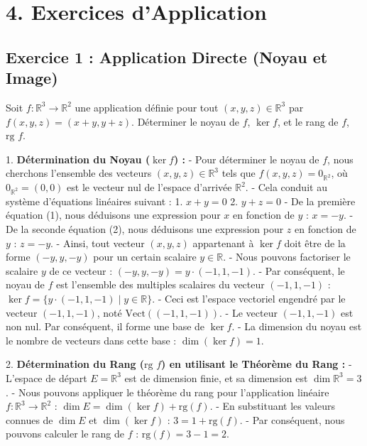 \documentclass{report}
\begin{document}
\section*{4. Exercices d'Application}

\subsection*{Exercice 1 : Application Directe (Noyau et Image)}
 Soit $f : \mathbb{R}^3 \to \mathbb{R}^2$ une application définie pour tout $(x,y,z) \in \mathbb{R}^3$ par $f(x,y,z) = (x+y, y+z)$. Déterminer le noyau de $f$, $\ker f$, et le rang de $f$, $\text{rg } f$.

1.  \textbf{Détermination du Noyau ($\ker f$) :}
    -   Pour déterminer le noyau de $f$, nous cherchons l'ensemble des vecteurs $(x,y,z) \in \mathbb{R}^3$ tels que $f(x,y,z) = 0_{\mathbb{R}^2}$, où $0_{\mathbb{R}^2} = (0,0)$ est le vecteur nul de l'espace d'arrivée $\mathbb{R}^2$.
    -   Cela conduit au système d'équations linéaires suivant :
        1.  $x+y = 0$
        2.  $y+z = 0$
    -   De la première équation (1), nous déduisons une expression pour $x$ en fonction de $y$ :
        $x = -y$.
    -   De la seconde équation (2), nous déduisons une expression pour $z$ en fonction de $y$ :
        $z = -y$.
    -   Ainsi, tout vecteur $(x,y,z)$ appartenant à $\ker f$ doit être de la forme $(-y, y, -y)$ pour un certain scalaire $y \in \mathbb{R}$.
    -   Nous pouvons factoriser le scalaire $y$ de ce vecteur :
        $(-y, y, -y) = y \cdot (-1, 1, -1)$.
    -   Par conséquent, le noyau de $f$ est l'ensemble des multiples scalaires du vecteur $(-1, 1, -1)$ :
        $\ker f = \{ y \cdot (-1, 1, -1) \mid y \in \mathbb{R} \}$.
    -   Ceci est l'espace vectoriel engendré par le vecteur $(-1, 1, -1)$, noté $\text{Vect}((-1, 1, -1))$.
    -   Le vecteur $(-1, 1, -1)$ est non nul. Par conséquent, il forme une base de $\ker f$.
    -   La dimension du noyau est le nombre de vecteurs dans cette base :
        $\dim(\ker f) = 1$.

2.  \textbf{Détermination du Rang ($\text{rg } f$) en utilisant le Théorème du Rang :}
    -   L'espace de départ $E = \mathbb{R}^3$ est de dimension finie, et sa dimension est $\dim \mathbb{R}^3 = 3$.
    -   Nous pouvons appliquer le théorème du rang pour l'application linéaire $f : \mathbb{R}^3 \to \mathbb{R}^2$ :
        $\dim E = \dim(\ker f) + \text{rg}(f)$.
    -   En substituant les valeurs connues de $\dim E$ et $\dim(\ker f)$ :
        $3 = 1 + \text{rg}(f)$.
    -   Par conséquent, nous pouvons calculer le rang de $f$ :
        $\text{rg}(f) = 3 - 1 = 2$.
\end{document}
